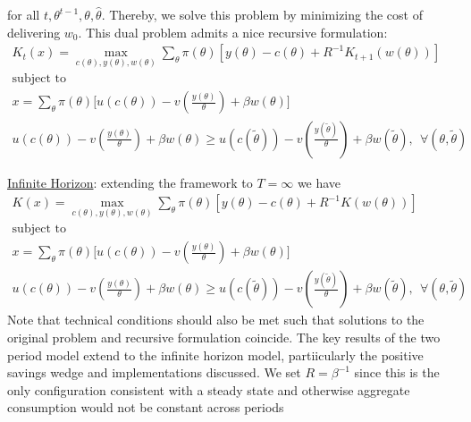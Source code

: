 \documentclass{article}
\begin{document}
for all $t, \theta^{t-1}, \theta, \widehat{\theta}$. Thereby, we solve this problem by minimizing the cost of delivering $w_{0}$. This dual problem admits a nice recursive formulation:
\begin{gather*}
    K_{t}(x) = \max_{c(\theta), y(\theta), w(\theta)} \sum_{\theta} \pi(\theta) [y(\theta) - c(\theta) + R^{-1}K_{t+1}(w(\theta))] \\
    \text{subject to} \\
    x = \sum_{\theta} \pi (\theta) \big[ u(c(\theta)) - v(\frac{y(\theta)}{\theta}) + \beta w(\theta) \big] \tag{PKC} \\
    u(c(\theta)) - v(\frac{y(\theta)}{\theta}) + \beta w (\theta) \geq u(c(\widetilde{\theta})) - v(\frac{y(\widetilde{\theta})}{\theta}) + \beta w(\widetilde{\theta}), \ \ \forall (\theta, \widetilde{\theta}) \tag{IC}
\end{gather*}
\vspace{2.5mm}
\par \underline{Infinite Horizon}: extending the framework to $T = \infty$ we have
\begin{gather*}
    K(x) = \max_{c(\theta), y(\theta), w(\theta)} \sum_{\theta} \pi (\theta) [y(\theta) - c(\theta) + R^{-1} K (w(\theta))] \\
    \text{subject to} \\
    x = \sum_{\theta} \pi (\theta) \big[u(c(\theta)) - v(\frac{y(\theta)}{\theta}) + \beta w(\theta) \big] \tag{PKC} \\
    u(c(\theta)) - v(\frac{y(\theta)}{\theta}) + \beta w(\theta) \geq u(c(\widetilde{\theta})) - v(\frac{y(\widetilde{\theta})}{\theta}) +  \beta w(\widetilde{\theta}), \ \ \forall (\theta, \widetilde{\theta}) \tag{IC}
\end{gather*}
Note that technical conditions should also be met such that solutions to the original problem and recursive formulation coincide. The key results of the two period model extend to the infinite horizon model, partiicularly the positive savings wedge and implementations discussed. We set $R = \beta^{-1}$ since this is the only configuration consistent with a steady state and otherwise aggregate consumption would not be constant across periods
\end{document}
